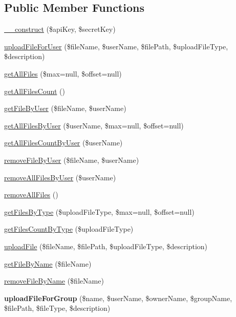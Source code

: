 \subsection*{Public Member Functions}
\begin{DoxyCompactItemize}
\item 
\hyperlink{class_upload_service_a49f2ad222e06420736d750e167d55d7c}{\+\_\+\+\_\+construct} (\$api\+Key, \$secret\+Key)
\item 
\hyperlink{class_upload_service_a06c78fcedab128228ce78283a818926e}{upload\+File\+For\+User} (\$file\+Name, \$user\+Name, \$file\+Path, \$upload\+File\+Type, \$description)
\item 
\hyperlink{class_upload_service_ac002034415239ce67478bd8f218cabcf}{get\+All\+Files} (\$max=null, \$offset=null)
\item 
\hyperlink{class_upload_service_a96c99c9230eeed2eb028faa021f07a60}{get\+All\+Files\+Count} ()
\item 
\hyperlink{class_upload_service_a5e32e3ca630ce960eba47a0e73b5a918}{get\+File\+By\+User} (\$file\+Name, \$user\+Name)
\item 
\hyperlink{class_upload_service_a3a9f5e68c0a8babd8da8314095b40a6c}{get\+All\+Files\+By\+User} (\$user\+Name, \$max=null, \$offset=null)
\item 
\hyperlink{class_upload_service_a2d2d47748ce7f6dc1c6cf33f4ea161db}{get\+All\+Files\+Count\+By\+User} (\$user\+Name)
\item 
\hyperlink{class_upload_service_a98fe2cf6081b4bd75732914d713df855}{remove\+File\+By\+User} (\$file\+Name, \$user\+Name)
\item 
\hyperlink{class_upload_service_ae3257388af72157f33f6b4569b2ca9e0}{remove\+All\+Files\+By\+User} (\$user\+Name)
\item 
\hyperlink{class_upload_service_a28747d3c807c86d68e593cc522298a81}{remove\+All\+Files} ()
\item 
\hyperlink{class_upload_service_ab87862c57c2a39d86fadc65fb7a16f07}{get\+Files\+By\+Type} (\$upload\+File\+Type, \$max=null, \$offset=null)
\item 
\hyperlink{class_upload_service_a2a7dcb0ae07b32893be7a7e3751f2348}{get\+Files\+Count\+By\+Type} (\$upload\+File\+Type)
\item 
\hyperlink{class_upload_service_af7dce3b417e719967b27f50fecc5261b}{upload\+File} (\$file\+Name, \$file\+Path, \$upload\+File\+Type, \$description)
\item 
\hyperlink{class_upload_service_aedda3716ba85afbe3be89ad01a6a2acd}{get\+File\+By\+Name} (\$file\+Name)
\item 
\hyperlink{class_upload_service_ae9776e90401158c03d727c41a92ab5c8}{remove\+File\+By\+Name} (\$file\+Name)
\item 
\hypertarget{class_upload_service_a428c6232b83e71f0b7158a2b3dd5e956}{{\bfseries upload\+File\+For\+Group} (\$name, \$user\+Name, \$owner\+Name, \$group\+Name, \$file\+Path, \$file\+Type, \$description)}\label{class_upload_service_a428c6232b83e71f0b7158a2b3dd5e956}


\end{DoxyCompactItemize}
